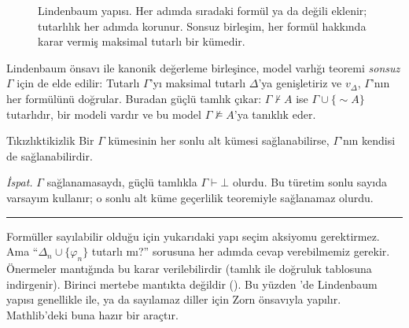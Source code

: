 \begin{figure}[htbp]
\centering
{}
\caption{Lindenbaum yapısı. Her adımda sıradaki formül ya da değili
eklenir; tutarlılık her adımda korunur. Sonsuz birleşim, her formül
hakkında karar vermiş maksimal tutarlı bir kümedir.}
\label{fig:lindenbaum}
\end{figure}

\noindent Lindenbaum önsavı ile kanonik değerleme birleşince, model
varlığı teoremi \emph{sonsuz} $\Gamma$ için de elde edilir: Tutarlı
$\Gamma$'yı maksimal tutarlı $\Delta$'ya genişletiriz ve $v_\Delta$,
$\Gamma$'nın her formülünü doğrular. Buradan güçlü tamlık çıkar:
$\Gamma \nvdash A$ ise $\Gamma \cup \{{\sim}A\}$ tutarlıdır, bir modeli
vardır ve bu model $\Gamma \nvDash A$'ya tanıklık eder.

\begin{teorem}{Tıkızlık}{tikizlik}
Bir $\Gamma$ kümesinin her sonlu alt kümesi sağlanabilirse, $\Gamma$'nın
kendisi de sağlanabilirdir.
\end{teorem}

\noindent \emph{İspat.} $\Gamma$ sağlanamasaydı, güçlü tamlıkla $\Gamma
\vdash \bot$ olurdu. Bu türetim sonlu sayıda varsayım kullanır; o sonlu
alt küme geçerlilik teoremiyle sağlanamaz olurdu. \hfill\textcolor{teoremframe}{\rule{0.55em}{0.55em}}

\begin{dikkat}
Formüller sayılabilir olduğu için yukarıdaki yapı seçim aksiyomu
gerektirmez. Ama ``$\Delta_n \cup \{\varphi_n\}$ tutarlı mı?'' sorusuna
her adımda cevap verebilmemiz gerekir. Önermeler mantığında bu karar
verilebilirdir (tamlık ile doğruluk tablosuna indirgenir). Birinci
mertebe mantıkta değildir (). Bu yüzden \Lean{}'de Lindenbaum
yapısı genellikle  ile, ya da sayılamaz diller için
Zorn önsavıyla yapılır. Mathlib'deki  buna hazır bir
araçtır.
\end{dikkat}

